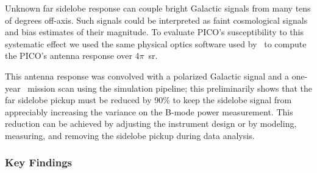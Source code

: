 \documentclass[PICOReport.tex]{subfiles}
\begin{document}
Unknown far sidelobe response can couple bright Galactic signals from many tens of degrees off-axis. Such signals could be interpreted as faint cosmological signals and bias estimates of their magnitude. To evaluate PICO's susceptibility to this systematic effect we used the same physical optics software used by \planck\ to compute the PICO's antenna response over $4\pi$~sr.  

This antenna response was convolved with a polarized Galactic signal and a one-year \pico\ mission scan using the simulation pipeline; this preliminarily shows that the far sidelobe pickup must be reduced by 90\%  to keep the sidelobe signal from appreciably increasing the variance on the B-mode power measurement.
This reduction can be achieved by adjusting the instrument design or by modeling, measuring, and removing the sidelobe pickup during data analysis.




\subsubsection{Key Findings}
\label{sec:systematics_key}
\end{document}
